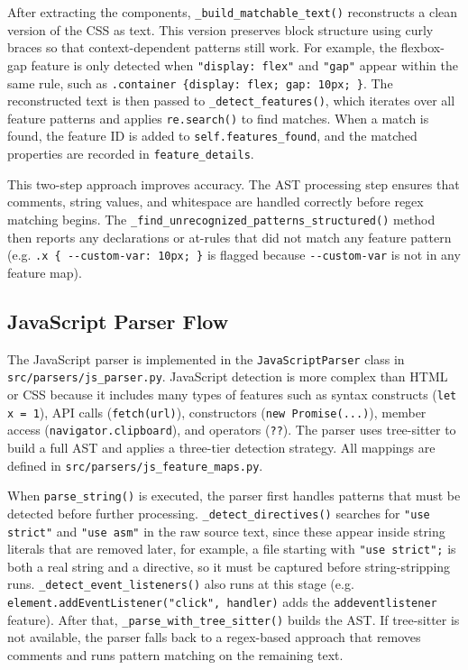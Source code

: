 After extracting the components, \texttt{\_build\_matchable\_text()} reconstructs a clean version of the CSS as text. This version preserves block structure using curly braces so that context-dependent patterns still work. For example, the flexbox-gap feature is only detected when \texttt{"display: flex"} and \texttt{"gap"} appear within the same rule, such as \texttt{.container \{display: flex; gap: 10px; \}}. The reconstructed text is then passed to \texttt{\_detect\_features()}, which iterates over all feature patterns and applies \texttt{re.search()} to find matches. When a match is found, the feature ID is added to \texttt{self.features\_found}, and the matched properties are recorded in \texttt{feature\_details}.

This two-step approach improves accuracy. The AST processing step ensures that comments, string values, and whitespace are handled correctly before regex matching begins. The \texttt{\_find\_unrecognized\_patterns\_structured()} method then reports any declarations or at-rules that did not match any feature pattern (e.g. \texttt{.x \{ -{}-custom-var: 10px; \}} is flagged because \texttt{-{}-custom-var} is not in any feature map).

\subsection{JavaScript Parser Flow}

The JavaScript parser is implemented in the \texttt{JavaScriptParser} class in \texttt{src/parsers/js\_parser.py}. JavaScript detection is more complex than HTML or CSS because it includes many types of features such as syntax constructs (\texttt{let x = 1}), API calls (\texttt{fetch(url)}), constructors (\texttt{new Promise(...)}), member access (\texttt{navigator.clipboard}), and operators (\texttt{??}). The parser uses tree-sitter to build a full AST and applies a three-tier detection strategy. All mappings are defined in \texttt{src/parsers/js\_feature\_maps.py}.

When \texttt{parse\_string()} is executed, the parser first handles patterns that must be detected before further processing. \texttt{\_detect\_directives()} searches for \texttt{"use strict"} and \texttt{"use asm"} in the raw source text, since these appear inside string literals that are removed later, for example, a file starting with \texttt{"use strict";} is both a real string and a directive, so it must be captured before string-stripping runs. \texttt{\_detect\_event\_listeners()} also runs at this stage (e.g. \texttt{element.addEventListener("click", handler)} adds the \texttt{addeventlistener} feature). After that, \texttt{\_parse\_with\_tree\_sitter()} builds the AST. If tree-sitter is not available, the parser falls back to a regex-based approach that removes comments and runs pattern matching on the remaining text.


